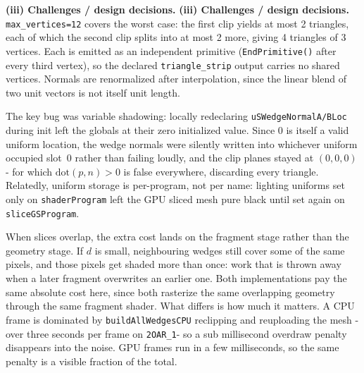 \documentclass[10pt]{article}
\begin{document}
\textbf{(iii) Challenges / design decisions.} 
\textbf{(iii) Challenges / design decisions.} \texttt{max\_vertices=12} covers the
worst case: the first clip yields at most 2 triangles, each of which the second clip
splits into at most 2 more, giving 4 triangles of 3 vertices. Each is emitted as an
independent primitive (\texttt{EndPrimitive()} after every third vertex), so the
declared \texttt{triangle\_strip} output carries no shared vertices. Normals are
renormalized after interpolation, since the linear blend of two unit vectors is not
itself unit length.

The key bug was variable shadowing: locally redeclaring
\texttt{uSWedgeNormalA/BLoc} during init left the globals at their
zero initialized value. Since $0$ is itself a valid uniform location, the wedge
normals were silently written into whichever uniform occupied slot~0 rather than
failing loudly, and the clip planes stayed at $(0,0,0)$ - for which
$\mathrm{dot}(p,n)>0$ is false everywhere, discarding every triangle. Relatedly,
uniform storage is per-program, not per name: lighting uniforms set only on
\texttt{shaderProgram} left the GPU sliced mesh pure black until set again on
\texttt{sliceGSProgram}.

When slices overlap, the extra cost lands on the fragment stage rather than the
geometry stage. If $d$ is small, neighbouring wedges still cover some of the same
pixels, and those pixels get shaded more than once: work that is thrown away
when a later fragment overwrites an earlier one. Both implementations pay the
same absolute cost here, since both rasterize the same overlapping geometry
through the same fragment shader. What differs is how much it matters. A CPU
frame is dominated by \texttt{buildAllWedgesCPU} reclipping and reuploading the
mesh - over three seconds per frame on \texttt{2OAR\_1}- so a sub millisecond
overdraw penalty disappears into the noise. GPU frames run in a few
milliseconds, so the same penalty is a visible fraction of the total.
\end{document}
